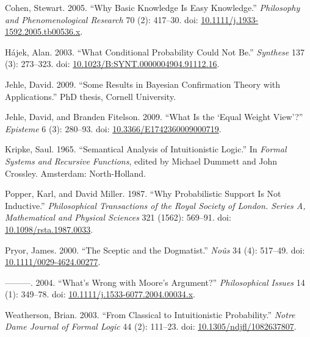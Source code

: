 \documentclass[
  10pt,
  letterpaper,
  DIV=11,
  numbers=noendperiod,
  twoside]{scrartcl}
\newlength{\cslhangindent}
\newenvironment{CSLReferences}[2] %
 {\begin{list}{}{%
  \setlength{\itemindent}{0pt}
  \setlength{\leftmargin}{0pt}
  \setlength{\parsep}{0pt}
  \ifodd #1
   \setlength{\leftmargin}{\cslhangindent}
   \setlength{\itemindent}{-1\cslhangindent}
  \fi
  \setlength{\itemsep}{#2\baselineskip}}}
 {\end{list}}
\begin{document}
\label{refs}
\begin{CSLReferences}{1}{0}
Cohen, Stewart. 2005. {``Why Basic Knowledge Is Easy Knowledge.''}
\emph{Philosophy and Phenomenological Research} 70 (2): 417--30. doi:
\href{https://doi.org/10.1111/j.1933-1592.2005.tb00536.x}{10.1111/j.1933-1592.2005.tb00536.x}.

Hájek, Alan. 2003. {``What Conditional Probability Could Not Be.''}
\emph{Synthese} 137 (3): 273--323. doi:
\href{https://doi.org/10.1023/B:SYNT.0000004904.91112.16}{10.1023/B:SYNT.0000004904.91112.16}.

Jehle, David. 2009. {``Some Results in Bayesian Confirmation Theory with
Applications.''} PhD thesis, Cornell University.

Jehle, David, and Branden Fitelson. 2009. {``What Is the {`Equal Weight
View'}?''} \emph{Episteme} 6 (3): 280--93. doi:
\href{https://doi.org/10.3366/E1742360009000719}{10.3366/E1742360009000719}.

Kripke, Saul. 1965. {``Semantical Analysis of Intuitionistic Logic.''}
In \emph{Formal Systems and Recursive Functions}, edited by Michael
Dummett and John Crossley. Amsterdam: North-Holland.

Popper, Karl, and David Miller. 1987. {``Why Probabilistic Support Is
Not Inductive.''} \emph{Philosophical Transactions of the Royal Society
of London. Series A, Mathematical and Physical Sciences} 321 (1562):
569--91. doi:
\href{https://doi.org/10.1098/rsta.1987.0033}{10.1098/rsta.1987.0033}.

Pryor, James. 2000. {``The Sceptic and the Dogmatist.''} \emph{No{û}s}
34 (4): 517--49. doi:
\href{https://doi.org/10.1111/0029-4624.00277}{10.1111/0029-4624.00277}.

---------. 2004. {``What's Wrong with Moore's Argument?''}
\emph{Philosophical Issues} 14 (1): 349--78. doi:
\href{https://doi.org/10.1111/j.1533-6077.2004.00034.x}{10.1111/j.1533-6077.2004.00034.x}.

Weatherson, Brian. 2003. {``From Classical to Intuitionistic
Probability.''} \emph{Notre Dame Journal of Formal Logic} 44 (2):
111--23. doi:
\href{https://doi.org/10.1305/ndjfl/1082637807}{10.1305/ndjfl/1082637807}.


\end{CSLReferences}
\end{document}
